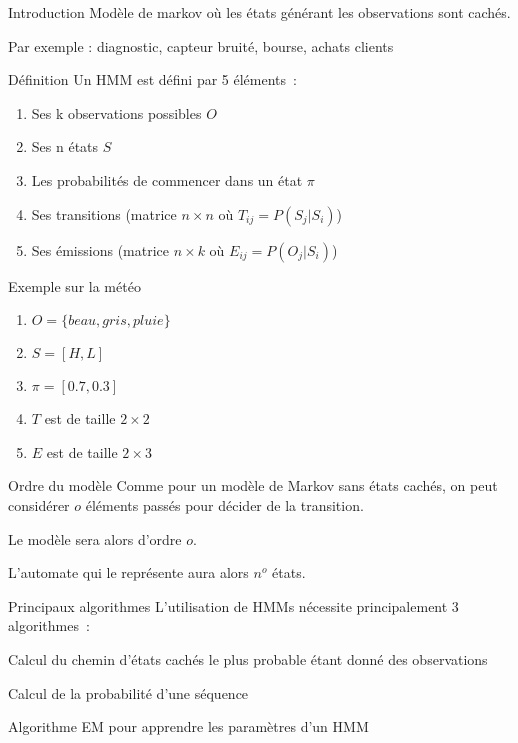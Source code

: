 \begin{frame}{Introduction}
  Modèle de markov où les états générant les observations sont cachés.

  Par exemple : diagnostic, capteur bruité, bourse, achats clients

\end{frame}

\begin{frame}{Définition}
  Un HMM est défini par 5 éléments~:
  \begin{enumerate}[<+->]
  \item Ses k observations possibles $O$
  \item Ses n états $S$
  \item Les probabilités de commencer dans un état $\pi$
  \item Ses transitions (matrice $n\times n$ où $T_{ij} = P(S_j|S_i)$)
  \item Ses émissions (matrice $n\times k$ où $E_{ij} = P(O_j|S_i)$)
  \end{enumerate}
\end{frame}

\begin{frame}{Exemple sur la météo} 
  \begin{enumerate}[<+->]
  \item $O = \{beau,gris,pluie\}$ 
  \item $S =  [H, L]$
  \item $\pi = [0.7, 0.3]$
  \item $T$ est de taille $2 \times 2$ 
  \item $E$ est de taille $2\times 3$
  \end{enumerate}


\end{frame}

\begin{frame}{Ordre du modèle}
  Comme pour un modèle de Markov sans états cachés, on peut considérer $o$ éléments passés pour décider de la transition.

  Le modèle sera alors d'ordre $o$.

  L'automate qui le représente aura alors $n^o$ états.
\end{frame}

\begin{frame}{Principaux algorithmes}
  L'utilisation de HMMs nécessite principalement 3 algorithmes~:

  \begin{description}[<+->]
  \item[Viterbi] Calcul du chemin d'états cachés le plus probable étant donné des observations
  \item[Forward-Backward] Calcul de la probabilité d'une séquence
  \item[Baum-Welch] Algorithme EM pour apprendre les paramètres d'un HMM
  \end{description}
\end{frame}

